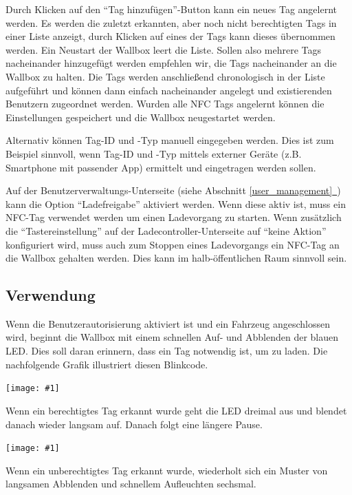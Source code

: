 \documentclass[a4paper,10pt]{article}
\newcommand{\gfx}[1]{\texttt{[image: \#1]}}
\newcommand*{\fullref}[1]{Abschnitt \hyperref[{#1}]{\ref*{#1}~\nameref*{#1}}}
\begin{document}
\begin{multicols*}{2}
    Durch Klicken auf den \enquote{Tag hinzufügen}-Button kann ein neues Tag angelernt werden.
    Es werden die zuletzt erkannten, aber noch nicht berechtigten Tags in einer
    Liste anzeigt, durch Klicken auf eines der Tags kann dieses übernommen werden. Ein Neustart der
    Wallbox leert die Liste. Sollen also mehrere Tags nacheinander hinzugefügt
    werden empfehlen wir, die Tags nacheinander an die Wallbox zu halten. Die
    Tags werden anschließend chronologisch in der Liste aufgeführt und können
    dann einfach nacheinander angelegt und existierenden Benutzern zugeordnet
    werden. Wurden alle NFC Tags angelernt können die Einstellungen gespeichert und die
    Wallbox neugestartet werden.

    \columnbreak

    Alternativ können Tag-ID und -Typ manuell eingegeben werden. Dies ist zum Beispiel sinnvoll,
    wenn Tag-ID und -Typ mittels externer Geräte (z.B. Smartphone mit passender
    App) ermittelt und eingetragen werden sollen.

    Auf der Benutzerverwaltungs-Unterseite (siehe \fullref{user_management}) kann die Option \enquote{Ladefreigabe} aktiviert werden.
    Wenn diese aktiv ist, muss ein NFC-Tag verwendet werden um einen Ladevorgang zu starten.
    Wenn zusätzlich die \enquote{Tastereinstellung} auf der Ladecontroller-Unterseite auf \enquote{keine Aktion} konfiguriert wird,
    muss auch zum Stoppen eines Ladevorgangs ein NFC-Tag an die Wallbox gehalten werden. Dies kann im
    halb-öffentlichen Raum sinnvoll sein.

    \subsection{Verwendung}
    Wenn die Benutzerautorisierung aktiviert ist und ein Fahrzeug angeschlossen wird,
    beginnt die Wallbox mit einem schnellen Auf- und Abblenden der blauen LED.
    Dies soll daran erinnern, dass ein Tag notwendig ist, um zu laden. Die
    nachfolgende Grafik illustriert diesen Blinkcode.

    \gfx{./img_warp2/resized/blink_nag}

    Wenn ein berechtigtes Tag erkannt wurde geht die LED
    dreimal aus und blendet danach wieder langsam auf. Danach folgt eine längere Pause.

    \gfx{./img_warp2/resized/blink_ack}

    Wenn ein unberechtigtes Tag erkannt wurde, wiederholt sich ein Muster von langsamen Abblenden
    und schnellem Aufleuchten sechsmal.


\end{multicols*}
\end{document}
